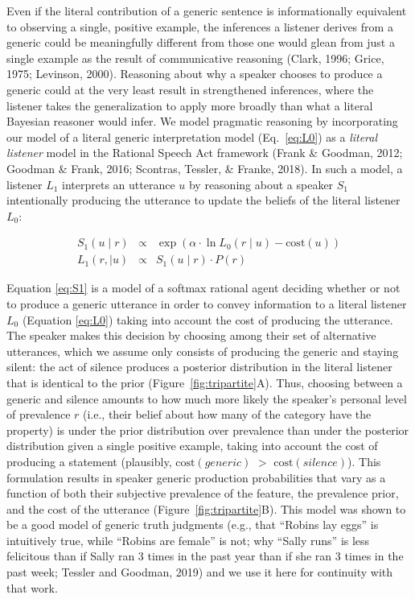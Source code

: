\documentclass[floatsintext,doc]{apa6}
\begin{document}
Even if the literal contribution of a generic sentence is informationally equivalent to observing a single, positive example, the inferences a listener derives from a generic could be meaningfully different from those one would glean from just a single example as the result of communicative reasoning  (Clark, 1996; Grice, 1975; Levinson, 2000).
Reasoning about why a speaker chooses to produce a generic could at the very least result in strengthened inferences, where the listener takes the generalization to apply more broadly than what a literal Bayesian reasoner would infer. 
We model pragmatic reasoning by incorporating our model of a literal generic interpretation model (Eq.~\ref{eq:L0}) as a \emph{literal listener} model in the Rational Speech Act framework (Frank \& Goodman, 2012; Goodman \& Frank, 2016; Scontras, Tessler, \& Franke, 2018).
In such a model, a listener \(L_1\) interprets an utterance $u$ by reasoning about a speaker \(S_1\) intentionally producing the utterance to update the beliefs of the literal listener \(L_0\):

\begin{eqnarray}
S_1(u \mid r) &\propto& \exp{(\alpha \cdot \ln L_0(r \mid u) - \text{cost}(u))} \label{eq:S1} \\
L_1(r, \mid u) &\propto& S_1(u \mid r) \cdot P(r) \label{eq:L1}
\end{eqnarray}

Equation \ref{eq:S1} is a model of a softmax rational agent deciding whether or not to produce a generic utterance in order to convey information to a literal listener $L_0$  (Equation \ref{eq:L0}) taking into account the cost of producing the utterance.
The speaker makes this decision by choosing among their set of alternative utterances, which we assume only consists of producing the generic and staying silent: the act of silence produces a posterior distribution in the literal listener that is identical to the prior (Figure~\ref{fig:tripartite}A). 
Thus, choosing between a generic and silence amounts to how much more likely the speaker's personal level of prevalence $r$ (i.e., their belief about how many of the category have the property) is under the prior distribution over prevalence than under the posterior distribution given a single positive example, taking into account the cost of producing a statement (plausibly, \(\text{cost}(generic)\) \(>\) \(\text{cost}(silence)\)). 
This formulation results in speaker generic production probabilities that vary as a function of both their subjective prevalence of the feature, the prevalence prior, and the cost of the utterance (Figure~\ref{fig:tripartite}B).
This model was shown to be a good model of generic truth judgments (e.g., that ``Robins lay eggs'' is intuitively true, while ``Robins are female'' is not; why ``Sally runs'' is less felicitous than if Sally ran 3 times in the past year than if she ran 3 times in the past week; Tessler and Goodman, 2019) and we use it here for continuity with that work. 
\end{document}
